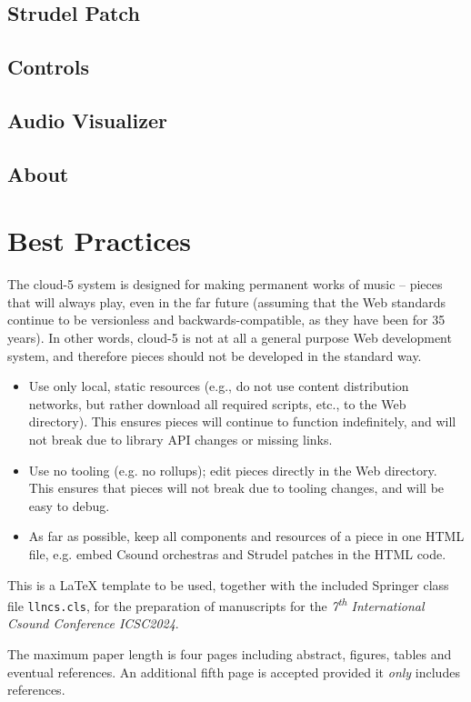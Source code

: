 \documentclass[runningheads,a4paper]{llncs}
\begin{document}
\subsection{Strudel Patch}
\subsection{Controls}
\subsection{Audio Visualizer}
\subsection{About}

\section{Best Practices}

The cloud-5 system is designed for making permanent works of music -- pieces that will always play, even in the far future (assuming that the Web standards continue to be versionless and backwards-compatible, as they have been for 35 years). In other words, cloud-5 is not at all a general purpose Web development system, and therefore pieces should not be developed in the standard way.

\begin{itemize}
\item Use only local, static resources (e.g., do not use content distribution networks, but rather download all required scripts, etc., to the Web directory). This ensures pieces will continue to function indefinitely, and will not break due to library API changes or missing links.
\item Use no tooling (e.g. no rollups); edit pieces directly in the Web directory. This ensures that pieces will not break due to tooling changes, and will be easy to debug.
\item As far as possible, keep all components and resources of a piece in one HTML file, e.g. embed Csound orchestras and Strudel patches in the HTML code.
\end{itemize}

This is a \LaTeX{} template to be used, together with the included Springer
class file \texttt{llncs.cls}, for the preparation of manuscripts for the
\textit{7\textsuperscript{th} International Csound Conference
\textemdash{} ICSC2024}.

The maximum paper length is four pages including abstract, figures, tables
and eventual references. An additional fifth page is accepted provided it
\textit{only} includes references.
\end{document}
